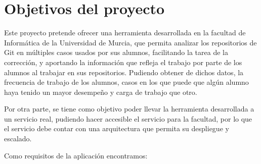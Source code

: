 \chapter{Objetivos del proyecto\label{03analisisObjetivos}}

Este proyecto pretende ofrecer una herramienta desarrollada en la facultad de Informática de la Universidad de Murcia, que permita analizar los repositorios de Git en múltiples casos usados por sus alumnos, facilitando la tarea de la corrección, y aportando la información que refleja el trabajo por parte de los alumnos al trabajar en sus repositorios. Pudiendo obtener de dichos datos, la frecuencia de trabajo de los alumnos, casos en los que puede que algún alumno haya tenido un mayor desempeño y carga de trabajo que otro.

Por otra parte, se tiene como objetivo poder llevar la herramienta desarrollada a un servicio real, pudiendo hacer accesible el servicio para la facultad, por lo que el servicio debe contar con una arquitectura que permita su despliegue y escalado.

Como requisitos de la aplicación encontramos:


